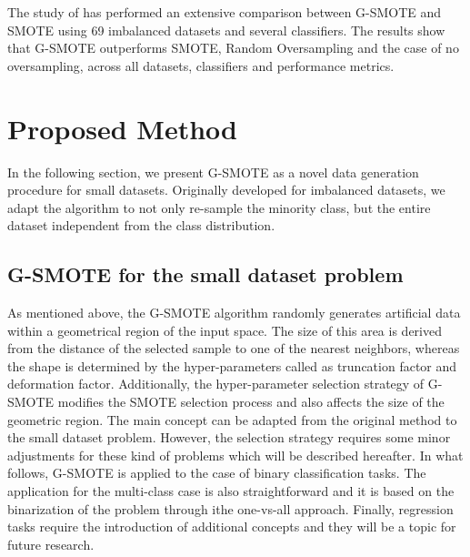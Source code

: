 \documentclass[parskip=full]{scrartcl}
\begin{document}
The study of \cite{Douzas.2019b} has performed an extensive comparison between G-SMOTE and 
SMOTE using 69 imbalanced datasets and several classifiers. The results show that G-SMOTE 
outperforms SMOTE, Random Oversampling and the case of no oversampling, across all datasets, 
classifiers and performance metrics.

\section{Proposed Method}

In the following section, we present G-SMOTE as a novel data generation procedure for small datasets. 
Originally developed for imbalanced datasets, we adapt the algorithm to not only re-sample the minority 
class, but the entire dataset independent from the class distribution. 

\subsection{G-SMOTE for the small dataset problem}

As mentioned above, the G-SMOTE algorithm randomly generates artificial data within a geometrical 
region of the input space. The size of this area is derived from the distance of the selected sample to 
one of the nearest neighbors, whereas the shape is determined by the hyper-parameters called as 
truncation factor and deformation factor. Additionally, the hyper-parameter selection
strategy of G-SMOTE modifies the SMOTE selection process and also affects the size of the geometric 
region. The main concept can be adapted from the original method to the small dataset problem. 
However, the selection strategy requires some minor adjustments for these kind of problems
which will be described hereafter. In what follows, G-SMOTE is applied to the case of binary 
classification tasks. The application for the multi-class case is also straightforward and it is based on 
the binarization of the problem through ithe one-vs-all approach. Finally, regression tasks require the 
introduction of additional concepts and they will be a topic for future research.
\end{document}
